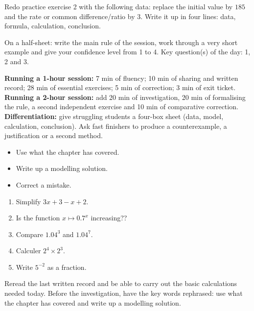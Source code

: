 
\begin{dm}Redo practice exercise 2 with the following data: replace the initial value by $185$ and the rate or common difference/ratio by $3$. Write it up in four lines: data, formula, calculation, conclusion.\end{dm}

\begin{sortie}On a half-sheet: write the main rule of the session, work through a very short example and give your confidence level from 1 to 4. Key question(s) of the day: 1, 2 and 3.\end{sortie}

\ifprof
\begin{methode}
\textbf{Running a 1-hour session:} 7 min of fluency; 10 min of sharing and written record; 28 min of essential exercises; 5 min of correction; 3 min of exit ticket.\\
\textbf{Running a 2-hour session:} add 20 min of investigation, 20 min of formalising the rule, a second independent exercise and 10 min of comparative correction.\\
\textbf{Differentiation:} give struggling students a four-box sheet (data, model, calculation, conclusion). Ask fast finishers to produce a counterexample, a justification or a second method.
\end{methode}
\fi
{}
\begin{objectifs}\begin{itemize}\item Use what the chapter has covered.\item Write up a modelling solution.\item Correct a mistake.\end{itemize}\end{objectifs}
\begin{automatismes}\begin{enumerate}\item Simplify $3x+3-x+2$. \item Is the function $x\mapsto0.7^x$ increasing?? \item Compare $1.04^3$ and $1.04^7$. \item Calculer $2^4\times2^3$. \item Write $5^{-2}$ as a fraction. \end{enumerate}\end{automatismes}
\begin{prerequis}Reread the last written record and be able to carry out the basic calculations needed today. Before the investigation, have the key words rephrased: use what the chapter has covered and write up a modelling solution.\end{prerequis}

